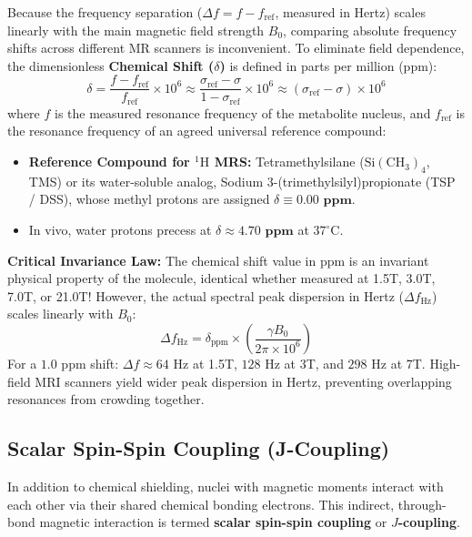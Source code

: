 \documentclass[11pt,a4paper]{article}
\begin{document}
\begin{physicsbox}
Because the frequency separation ($\Delta f = f - f_{\text{ref}}$, measured in Hertz) scales linearly with the main magnetic field strength $B_0$, comparing absolute frequency shifts across different MR scanners is inconvenient. To eliminate field dependence, the dimensionless \textbf{Chemical Shift ($\delta$)} is defined in parts per million ($\text{ppm}$):
\begin{equation}
    \delta = \frac{f - f_{\text{ref}}}{f_{\text{ref}}} \times 10^6 \approx \frac{\sigma_{\text{ref}} - \sigma}{1 - \sigma_{\text{ref}}} \times 10^6 \approx (\sigma_{\text{ref}} - \sigma) \times 10^6
\end{equation}
where $f$ is the measured resonance frequency of the metabolite nucleus, and $f_{\text{ref}}$ is the resonance frequency of an agreed universal reference compound:
\begin{itemize}
    \item \textbf{Reference Compound for $^1\text{H}$ MRS:} Tetramethylsilane ($\text{Si}(\text{CH}_3)_4$, TMS) or its water-soluble analog, Sodium 3-(trimethylsilyl)propionate (TSP / DSS), whose methyl protons are assigned $\delta \equiv \mathbf{0.00\text{ ppm}}$.
    \item In vivo, water protons precess at $\delta \approx \mathbf{4.70\text{ ppm}}$ at $37^\circ\text{C}$.
\end{itemize}
\textbf{Critical Invariance Law:} The chemical shift value in $\text{ppm}$ is an invariant physical property of the molecule, identical whether measured at 1.5T, 3.0T, 7.0T, or 21.0T! However, the actual spectral peak dispersion in Hertz ($\Delta f_{\text{Hz}}$) scales linearly with $B_0$:
\begin{equation}
    \Delta f_{\text{Hz}} = \delta_{\text{ppm}} \times \left(\frac{\gamma B_0}{2\pi \times 10^6}\right)
\end{equation}
For a $1.0\text{ ppm}$ shift: $\Delta f \approx 64\text{ Hz}$ at 1.5T, $128\text{ Hz}$ at 3T, and $298\text{ Hz}$ at 7T. High-field MRI scanners yield wider peak dispersion in Hertz, preventing overlapping resonances from crowding together.
\end{physicsbox}

\subsection{Scalar Spin-Spin Coupling (J-Coupling)}
In addition to chemical shielding, nuclei with magnetic moments interact with each other via their shared chemical bonding electrons. This indirect, through-bond magnetic interaction is termed \textbf{scalar spin-spin coupling} or \textbf{$J$-coupling}.
\end{document}
